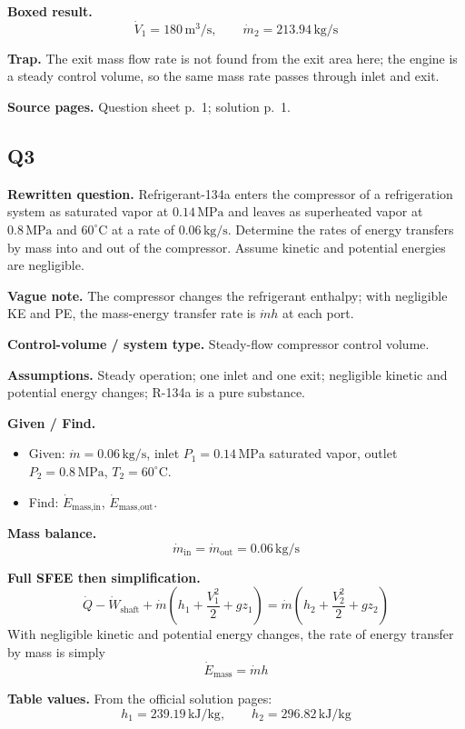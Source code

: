 \textbf{Boxed result.}
\[
\boxed{\dot V_1 = 180\,\text{m}^3/\text{s}, \qquad \dot m_2 = 213.94\,\text{kg/s}}
\]

\textbf{Trap.} The exit mass flow rate is not found from the exit area here; the engine is a steady control volume, so the same mass rate passes through inlet and exit.

\textbf{Source pages.} Question sheet p.~1; solution p.~1.

\subsection*{Q3}
\textbf{Rewritten question.} Refrigerant-134a enters the compressor of a refrigeration system as saturated vapor at $0.14\,\text{MPa}$ and leaves as superheated vapor at $0.8\,\text{MPa}$ and $60^\circ\text{C}$ at a rate of $0.06\,\text{kg/s}$. Determine the rates of energy transfers by mass into and out of the compressor. Assume kinetic and potential energies are negligible.

\textbf{Vague note.} The compressor changes the refrigerant enthalpy; with negligible KE and PE, the mass-energy transfer rate is $\dot m h$ at each port.

\textbf{Control-volume / system type.} Steady-flow compressor control volume.

\textbf{Assumptions.} Steady operation; one inlet and one exit; negligible kinetic and potential energy changes; R-134a is a pure substance.

\textbf{Given / Find.}
\begin{itemize}
  \item Given: $\dot m=0.06\,\text{kg/s}$, inlet $P_1=0.14\,\text{MPa}$ saturated vapor, outlet $P_2=0.8\,\text{MPa}$, $T_2=60^\circ\text{C}$.
  \item Find: $\dot E_{\text{mass,in}}$, $\dot E_{\text{mass,out}}$.
\end{itemize}

\textbf{Mass balance.}
\[
\dot m_{\text{in}}=\dot m_{\text{out}}=0.06\,\text{kg/s}
\]

\textbf{Full SFEE then simplification.}
\[
\dot Q-\dot W_{\text{shaft}}+\dot m\left(h_1+\frac{V_1^2}{2}+gz_1\right)
=\dot m\left(h_2+\frac{V_2^2}{2}+gz_2\right)
\]
With negligible kinetic and potential energy changes, the rate of energy transfer by mass is simply
\[
\dot E_{\text{mass}}=\dot m h
\]

\textbf{Table values.} From the official solution pages:
\[
 h_1 = 239.19\,\text{kJ/kg}, \qquad h_2 = 296.82\,\text{kJ/kg}
\]

